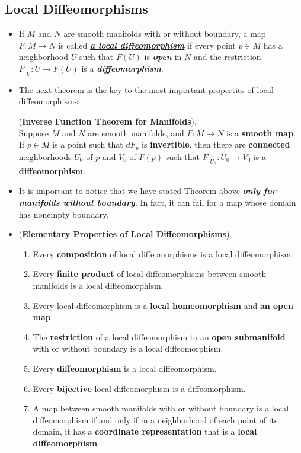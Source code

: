 \documentclass[11pt]{article}
\begin{document}
\subsection{Local Diffeomorphisms}
\begin{itemize}
\item \begin{definition}
If $M$ and $N$ are smooth manifolds with or without boundary, a map $F: M \rightarrow N$ is called \underline{\emph{\textbf{a local diffeomorphism}}} if every point $p \in M$ has a neighborhood $U$ such that $F(U)$ is \emph{\textbf{open}} in $N$ and the restriction $F|_{U}: U \rightarrow F(U)$ is a \emph{\textbf{diffeomorphism}}. 
\end{definition}

\item The next theorem is the key to the most important properties of local diffeomorphisms.
\begin{theorem} (\textbf{Inverse Function Theorem for Manifolds}). \citep{lee2003introduction} \\
Suppose $M$ and $N$ are smooth manifolds, and $F: M \rightarrow N$ is a \textbf{smooth map}. If  $p \in M$ is a point such that $dF_p$ is \textbf{invertible}, then there are \textbf{connected} neighborhoods $U_0$ of $p$ and $V_0$ of $F(p)$ such that $F|_{U_0}: U_0 \rightarrow V_0$ is a \textbf{diffeomorphism}.
\end{theorem}

\item \begin{remark}
It is important to notice that we have stated Theorem above \emph{\textbf{only for manifolds without boundary}}. In fact, it can fail for a map whose domain has nonempty boundary.
\end{remark}

\item \begin{proposition} (\textbf{Elementary Properties of Local Diffeomorphisms}).
\begin{enumerate}
\item Every \textbf{composition} of local diffeomorphisms is a local diffeomorphism.
\item Every \textbf{finite product} of local diffeomorphisms between smooth manifolds is a local diffeomorphism.
\item Every local diffeomorphism is a \textbf{local homeomorphism} and \textbf{an open map}.
\item The \textbf{restriction} of a local diffeomorphism to an \textbf{open submanifold} with or without boundary is a local diffeomorphism.
\item Every \textbf{diffeomorphism} is a local diffeomorphism.
\item Every \textbf{bijective} local diffeomorphism is a diffeomorphism.
\item A map between smooth manifolds with or without boundary is a local diffeomorphism if and only if in a neighborhood of each point of its domain, it has a \textbf{coordinate representation} that is a \textbf{local diffeomorphism}.
\end{enumerate}
\end{proposition}


\end{itemize}
\end{document}
